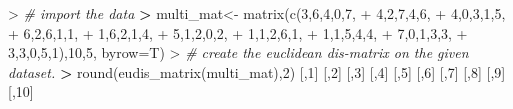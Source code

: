\documentclass[
]{article}
\newenvironment{Shaded}{\begin{snugshade}}{\end{snugshade}}
\newcommand{\AttributeTok}[1]{\textcolor[rgb]{0.77,0.63,0.00}{#1}}
\newcommand{\CommentTok}[1]{\textcolor[rgb]{0.56,0.35,0.01}{\textit{#1}}}
\newcommand{\DecValTok}[1]{\textcolor[rgb]{0.00,0.00,0.81}{#1}}
\newcommand{\ErrorTok}[1]{\textcolor[rgb]{0.64,0.00,0.00}{\textbf{#1}}}
\newcommand{\FunctionTok}[1]{\textcolor[rgb]{0.00,0.00,0.00}{#1}}
\newcommand{\NormalTok}[1]{#1}
\newcommand{\OtherTok}[1]{\textcolor[rgb]{0.56,0.35,0.01}{#1}}
\newcommand{\SpecialCharTok}[1]{\textcolor[rgb]{0.00,0.00,0.00}{#1}}
\begin{document}
\begin{Shaded}
\begin{Highlighting}[]
\SpecialCharTok{\textgreater{}} \CommentTok{\# import the data}
\ErrorTok{\textgreater{}}\NormalTok{ multi\_mat}\OtherTok{\textless{}{-}} \FunctionTok{matrix}\NormalTok{(}\FunctionTok{c}\NormalTok{(}\DecValTok{3}\NormalTok{,}\DecValTok{6}\NormalTok{,}\DecValTok{4}\NormalTok{,}\DecValTok{0}\NormalTok{,}\DecValTok{7}\NormalTok{,}
\SpecialCharTok{+}                     \DecValTok{4}\NormalTok{,}\DecValTok{2}\NormalTok{,}\DecValTok{7}\NormalTok{,}\DecValTok{4}\NormalTok{,}\DecValTok{6}\NormalTok{,}
\SpecialCharTok{+}                     \DecValTok{4}\NormalTok{,}\DecValTok{0}\NormalTok{,}\DecValTok{3}\NormalTok{,}\DecValTok{1}\NormalTok{,}\DecValTok{5}\NormalTok{,}
\SpecialCharTok{+}                     \DecValTok{6}\NormalTok{,}\DecValTok{2}\NormalTok{,}\DecValTok{6}\NormalTok{,}\DecValTok{1}\NormalTok{,}\DecValTok{1}\NormalTok{,}
\SpecialCharTok{+}                     \DecValTok{1}\NormalTok{,}\DecValTok{6}\NormalTok{,}\DecValTok{2}\NormalTok{,}\DecValTok{1}\NormalTok{,}\DecValTok{4}\NormalTok{, }
\SpecialCharTok{+}                     \DecValTok{5}\NormalTok{,}\DecValTok{1}\NormalTok{,}\DecValTok{2}\NormalTok{,}\DecValTok{0}\NormalTok{,}\DecValTok{2}\NormalTok{,}
\SpecialCharTok{+}                     \DecValTok{1}\NormalTok{,}\DecValTok{1}\NormalTok{,}\DecValTok{2}\NormalTok{,}\DecValTok{6}\NormalTok{,}\DecValTok{1}\NormalTok{,}
\SpecialCharTok{+}                     \DecValTok{1}\NormalTok{,}\DecValTok{1}\NormalTok{,}\DecValTok{5}\NormalTok{,}\DecValTok{4}\NormalTok{,}\DecValTok{4}\NormalTok{,}
\SpecialCharTok{+}                     \DecValTok{7}\NormalTok{,}\DecValTok{0}\NormalTok{,}\DecValTok{1}\NormalTok{,}\DecValTok{3}\NormalTok{,}\DecValTok{3}\NormalTok{,}
\SpecialCharTok{+}                     \DecValTok{3}\NormalTok{,}\DecValTok{3}\NormalTok{,}\DecValTok{0}\NormalTok{,}\DecValTok{5}\NormalTok{,}\DecValTok{1}\NormalTok{),}\DecValTok{10}\NormalTok{,}\DecValTok{5}\NormalTok{, }\AttributeTok{byrow=}\NormalTok{T)}
\SpecialCharTok{\textgreater{}} \CommentTok{\# create the euclidean dis{-}matrix on the given dataset.}
\ErrorTok{\textgreater{}} \FunctionTok{round}\NormalTok{(}\FunctionTok{eudis\_matrix}\NormalTok{(multi\_mat),}\DecValTok{2}\NormalTok{)}
\NormalTok{       [,}\DecValTok{1}\NormalTok{] [,}\DecValTok{2}\NormalTok{] [,}\DecValTok{3}\NormalTok{] [,}\DecValTok{4}\NormalTok{] [,}\DecValTok{5}\NormalTok{] [,}\DecValTok{6}\NormalTok{]  [,}\DecValTok{7}\NormalTok{] [,}\DecValTok{8}\NormalTok{] [,}\DecValTok{9}\NormalTok{] [,}\DecValTok{10}\NormalTok{]}

\end{Highlighting}
\end{Shaded}
\end{document}
